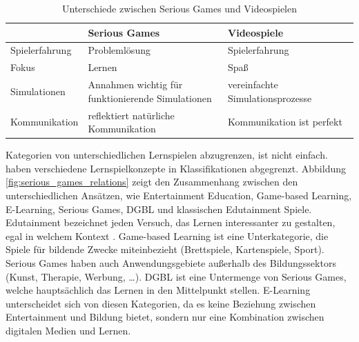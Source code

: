 \begin{table}[ht]
    \centering
    \begin{tabular}{|l|l|l|}
        \hline
        \rowcolor[rgb]{0.851,0.851,0.851}   & \textbf{Serious Games}                & \textbf{Videospiele} \\ 
        \hline
        Spielerfahrung           & Problemlösung                                    & Spielerfahrung \\ 
        \hline
        Fokus                    & Lernen                                           & Spaß \\ 
        \hline
        Simulationen             & \makecell[l]{Annahmen wichtig für \\ funktionierende Simulationen} & vereinfachte Simulationsprozesse \\ 
        \hline
        Kommunikation            & reflektiert natürliche Kommunikation             & Kommunikation ist perfekt \\
        \hline
    \end{tabular}
    \caption{Unterschiede zwischen Serious Games und Videospielen \cite{serious_games:2007:an_overview}}
	\label{tab:serious_games_vs_entertainment_games}
\end{table}

Kategorien von unterschiedlichen Lernspielen abzugrenzen, ist nicht einfach. \citeauthor{breuer_bente:2010:why_so_serious} haben verschiedene Lernspielkonzepte in Klassifikationen abgegrenzt. Abbildung \ref{fig:serious_games_relations} zeigt den Zusammenhang zwischen den unterschiedlichen Ansätzen, wie Entertainment Education, Game-based Learning, E-Learning, Serious Games, \ac{DGBL} und klassischen Edutainment Spiele. \cite{breuer_bente:2010:why_so_serious} \\
Edutainment bezeichnet jeden Versuch, das Lernen interessanter zu gestalten, egal in welchem Kontext \cite{michael:2006:educate}. Game-based Learning ist eine Unterkategorie, die Spiele für bildende Zwecke miteinbezieht (Brettspiele, Kartenspiele, Sport).
Serious Games haben auch Anwendungsgebiete außerhalb des Bildungssektors (Kunst, Therapie, Werbung, \dots). \ac{DGBL} ist eine Untermenge von Serious Games, welche hauptsächlich das Lernen in den Mittelpunkt stellen. E-Learning unterscheidet sich von diesen Kategorien, da es keine Beziehung zwischen Entertainment und Bildung bietet, sondern nur eine Kombination zwischen digitalen Medien und Lernen. \cite{breuer_bente:2010:why_so_serious} \\

